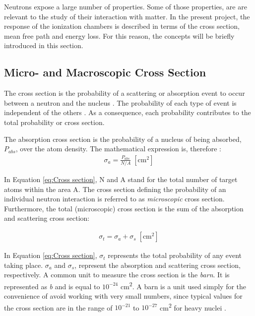 Neutrons expose a large number of properties. Some of those properties, are are relevant to the study of their interaction with matter. In the present project, the response of the ionization chambers is described in terms of the cross section, mean free path and energy loss. For this reason, the concepts will be briefly introduced in this section.

\subsection{Micro- and Macroscopic Cross Section}

The cross section is the probability of a scattering or absorption event to occur between a neutron and the nucleus \cite{rinard1991neutron}. The probability of each type of event is independent of the others \cite{rinard1991neutron}. As a consequence, each probability contributes to the total probability or cross section.

The absorption cross section is the probability of a nucleus of being absorbed, $P_{abs}$, over the atom density. The mathematical expression is, therefore \cite{rinard1991neutron}:
\begin{align} 
    \label{eq:Cross section}
    {\sigma_a = \frac{P_{abs}}{N / A} } \; [\unit{\square\cm}]
\end{align}

In Equation \ref{eq:Cross section}, N and A stand for the total number of target atoms within the area A.  The cross section defining the probability of an individual neutron interaction is referred to as \textit{microscopic} cross section. Furthermore, the total (microscopic) cross section is the sum of the absorption and scattering cross section:

\begin{align} 
    \label{eq:Total cross section}
    {\sigma_t = \sigma_a + \sigma_s } \; [\unit{\square\cm}]
\end{align}

In Equation \ref{eq:Cross section}, $\sigma_t$ represents the total probability of any event taking place. $\sigma_a$ and $\sigma_s$, represent the absorption and scattering cross section, respectively. A common unit to measure the cross section is the \textit{barn}. It is represented as \textit{b} and is equal to $10^{-24}$ \unit{\square\cm}. A barn is a unit used simply for the convenience of avoid working with very small numbers, since typical values for the cross section are in the range of $10^{-21}$ to $10^{-27}$ \unit{\square\cm} for heavy nuclei \cite{rinard1991neutron}. 

